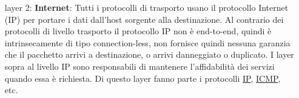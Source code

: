 \begin{enumerate}

    \item[layer 2:] \textbf{Internet}: Tutti i protocolli di trasporto usano il protocollo Internet (IP) per portare i dati dall'host sorgente alla destinazione. Al contrario dei protocolli di livello trasporto il protocollo IP non è end-to-end, quindi è intrinsecamente di tipo connection-less, non fornisce quindi nessuna garanzia che il pacchetto arrivi a destinazione, o arrivi danneggiato o duplicato. I layer sopra al livello IP sono responsabili di mantenere l'affidabilità dei servizi quando essa è richiesta. Di questo layer fanno parte i protocolli \href{https://en.wikipedia.org/wiki/Internet_Protocol}{IP}, \href{https://en.wikipedia.org/wiki/Internet_Control_Message_Protocol}{ICMP}, etc.
    


\end{enumerate}
